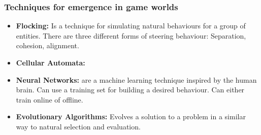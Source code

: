   \subsubsection*{Techniques for emergence in game worlds}

    \begin{itemize}
      \item {\bf Flocking:} Is a technique for simulating natural behaviours for a group of entities. There are three different forms of steering behaviour: Separation, cohesion, alignment. 
      \item {\bf Cellular Automata:}
      \item {\bf Neural Networks:} are a machine learning technique inspired by the human brain. Can use a training set for building a desired behaviour. Can either train online of offline. 
      \item {\bf Evolutionary Algorithms:} Evolves a solution to a problem in a similar way to natural selection and evaluation. 
    \end{itemize}